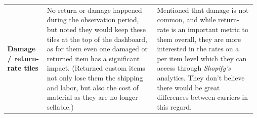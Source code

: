 \documentclass{imc-inf}
\begin{document}
\begin{longtable}{@{}>{\raggedright\arraybackslash}p{3cm}p{5.75cm}p{5.75cm}@{}}
  \textbf{Damage / return-rate tiles}                                                                                                                                                                                                                                                                                                                                                                                                                                                                                                                                                                                                                                                                                                                                                                                                                                                                          &
  No return or damage happened during the observation period, but noted they would keep these tiles at the top of the dashboard, as for them even one damaged or returned item has a significant impact. (Returned custom items not only lose them the shipping and labor, but also the cost of material as they are no longer sellable.)                                                                                                                                                                                                                                                                                                                                                                                                                                                                                                                                                                      &
  Mentioned that damage is not common, and while return-rate is an important metric to them overall, they are more interested in the rates on a per item level which they can access through \textit{Shopify's} analytics. They don't believe there would be great differences between carriers in this regard.                                                                                                                                                                                                                                                                                                                                                                                                                                                                                                                                                                                                                                            \\[6pt]


\end{longtable}
\end{document}
